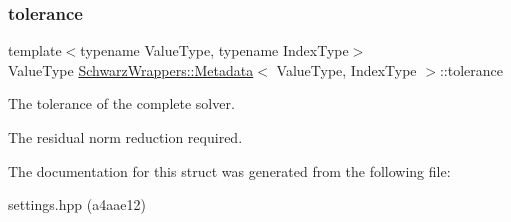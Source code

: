 \subsubsection{\texorpdfstring{tolerance}{tolerance}}
{\footnotesize\ttfamily template$<$typename Value\+Type, typename Index\+Type$>$ \\
Value\+Type \hyperlink{structSchwarzWrappers_1_1Metadata}{Schwarz\+Wrappers\+::\+Metadata}$<$ Value\+Type, Index\+Type $>$\+::tolerance}



The tolerance of the complete solver. 

The residual norm reduction required. 

The documentation for this struct was generated from the following file\+:\begin{DoxyCompactItemize}
\item 
settings.\+hpp (a4aae12)\end{DoxyCompactItemize}
